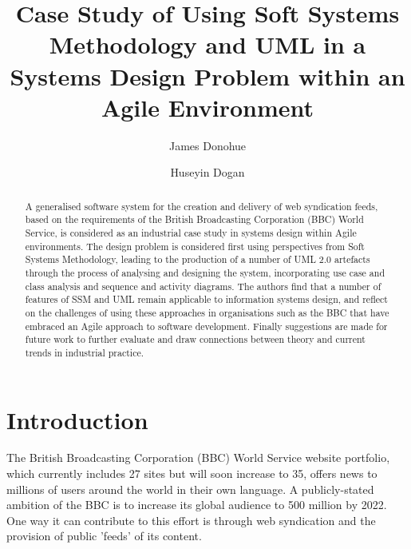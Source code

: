 \documentclass[runningheads,a4paper]{llncs}
\begin{document}
\mainmatter

\title{Case Study of Using Soft Systems Methodology and UML in a Systems Design Problem within an Agile Environment}

\author{James Donohue \and Huseyin Dogan}


\maketitle

\begin{abstract}
A generalised software system for the creation and delivery of web syndication feeds, based on the requirements of the British Broadcasting Corporation (BBC) World Service, is considered as an industrial case study in systems design within Agile environments. The design problem is considered first using perspectives from Soft Systems Methodology, leading to the production of a number of UML 2.0 artefacts through the process of analysing and designing the system, incorporating use case and class analysis and sequence and activity diagrams. The authors find that a number of features of SSM and UML remain applicable to information systems design, and reflect on the challenges of using these approaches in organisations such as the BBC that have embraced an Agile approach to software development. Finally suggestions are made for future work to further evaluate and draw connections between theory and current trends in industrial practice.

\end{abstract}

\section{Introduction}

The British Broadcasting Corporation (BBC) World Service website portfolio, which currently includes 27 sites but will soon increase to 35, offers news to millions of users around the world in their own language. A publicly-stated ambition of the BBC \cite{bbc2013} is to increase its global audience to 500 million by 2022. One way it can contribute to this effort is through web syndication and the provision of public 'feeds' of its content.
\end{document}
